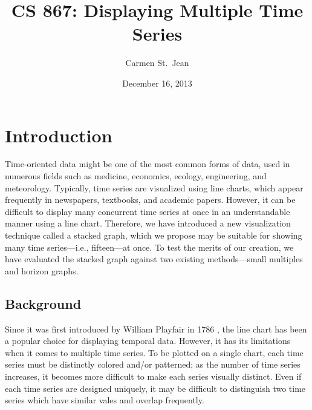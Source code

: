 \documentclass{article}
\begin{document}
\title{CS 867: Displaying Multiple Time Series}
\date{December 16, 2013}
\author{Carmen St.\ Jean}

\maketitle

\section{Introduction}

Time-oriented data might be one of the most common forms of data, used in numerous fields such as medicine, economics, ecology, engineering, and meteorology.  Typically, time series are visualized using line charts, which appear frequently in newspapers, textbooks, and academic papers.  However, it can be difficult to display many concurrent time series at once in an understandable manner using a line chart.  Therefore, we have introduced a new visualization technique called a stacked graph, which we propose may be suitable for showing many time series---i.e., fifteen---at once.  To test the merits of our creation, we have evaluated the stacked graph against two existing methods---small multiples and horizon graphs.

\subsection{Background}

Since it was first introduced by William Playfair in 1786 \cite{playfair1786}, the line chart has been a popular choice for displaying temporal data.  However, it has its limitations when it comes to multiple time series.  To be plotted on a single chart, each time series must be distinctly colored and/or patterned; as the number of time series increases, it becomes more difficult to make each series visually distinct.  Even if each time series are designed uniquely, it may be difficult to distinguish two time series which have similar vales and overlap frequently.
\end{document}
